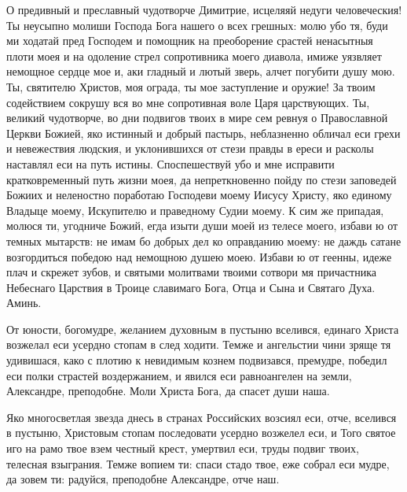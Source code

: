 

О предивный и преславный чудотворче Димитрие, исцеляяй недуги человеческия! Ты неусыпно молиши Господа Бога нашего о всех грешных: молю убо тя, буди ми ходатай пред Господем и помощник на преоборение срастей ненасытныя плоти моея и на одоление стрел сопротивника моего диавола, имиже уязвляет немощное сердце мое и, аки гладный и лютый зверь, алчет погубити душу мою. Ты, святителю Христов, моя ограда, ты мое заступление и оружие! За твоим содействием сокрушу вся во мне сопротивная воле Царя царствующих. Ты, великий чудотворче, во дни подвигов твоих в мире сем ревнуя о Православной Церкви Божией, яко истинный и добрый пастырь, неблазненно обличал еси грехи и невежествия людския, и уклонившихся от стези правды в ереси и расколы наставлял еси на путь истины. Споспешествуй убо и мне исправити кратковременный путь жизни моея, да непреткновенно пойду по стези заповедей Божиих и неленостно поработаю Господеви моему Иисусу Христу, яко единому Владыце моему, Искупителю и праведному Судии моему. К сим же припадая, молюся ти, угодниче Божий, егда изыти души моей из телесе моего, избави ю от темных мытарств: не имам бо добрых дел ко оправданию моему: не даждь сатане возгордиться победою над немощною душею моею. Избави ю от геенны, идеже плач и скрежет зубов, и святыми молитвами твоими сотвори мя причастника Небеснаго Царствия в Троице славимаго Бога, Отца и Сына и Святаго Духа. Аминь.
\longpage[2]{}\mychapterending

 


От юности, богомудре, желанием духовным в пустыню вселився, единаго Христа возжелал еси усердно стопам в след ходити. Темже и ангельстии чини зряще тя удивишася, како с плотию к невидимым кознем подвизався, премудре, победил еси полки страстей воздержанием, и явился еси равноангелен на земли, Александре, преподобне. Моли Христа Бога, да спасет души наша.




Яко многосветлая звезда днесь в странах Российских возсиял еси, отче, вселився в пустыню, Христовым стопам последовати усердно возжелел еси, и Того святое иго на рамо твое взем честный крест, умертвил еси, труды подвиг твоих, телесная взыграния. Темже вопием ти: спаси стадо твое, еже собрал еси мудре, да зовем ти: радуйся, преподобне Александре, отче наш.


